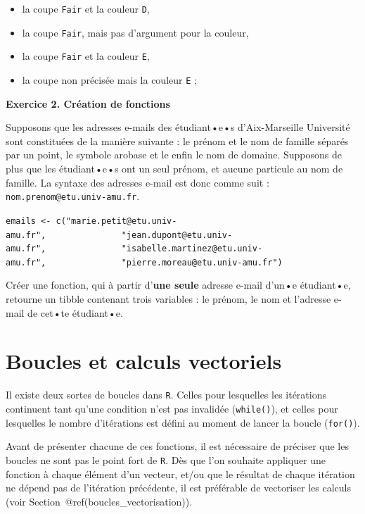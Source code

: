 \documentclass[
  11pt,
]{book}
\makeatletter
\providecommand{\tightlist}{%
  \setlength{\itemsep}{0pt}\setlength{\parskip}{0pt}}
\numberwithin{equation}{section}
\numberwithin{countremarque}{section}
\newenvironment{exframe}{%
 \def\at@end@of@exframe{}%
 \ifinner\ifhmode%
  \def\at@end@of@exframe{\end{minipage}}%
  \begin{minipage}{\columnwidth}%
 \fi\fi%
 \def\FrameCommand##1{\hskip\@totalleftmargin \hskip-\fboxsep
 \colorbox{shadecolorex}{##1}\hskip-\fboxsep
     \hskip-\linewidth \hskip-\@totalleftmargin \hskip\columnwidth}%
 \MakeFramed {\advance\hsize-\width
   \@totalleftmargin\z@ \linewidth\hsize
   \@setminipage}}%
 {\par\unskip\endMakeFramed%
 \at@end@of@exframe}
\makeatother
\begin{document}
\begin{exframe}
\begin{itemize}
\tightlist
\item
  la coupe \texttt{Fair} et la couleur \texttt{D},
\item
  la coupe \texttt{Fair}, mais pas d'argument pour la couleur,
\item
  la coupe \texttt{Fair} et la couleur \texttt{E},
\item
  la coupe non précisée mais la couleur \texttt{E} ;
\end{itemize}
\end{exframe}

\begin{exframe}
\textbf{Exercice 2. Création de fonctions}

Supposons que les adresses e-mails des étudiant•e•s d'Aix-Marseille Université sont constituées de la manière suivante : le prénom et le nom de famille séparés par un point, le symbole arobase et le enfin le nom de domaine. Supposons de plus que les étudiant•e•s ont un seul prénom, et aucune particule au nom de famille. La syntaxe des adresses e-mail est donc comme suit : \texttt{nom.prenom@etu.univ-amu.fr}.

\texttt{emails\ \textless{}-\ c("marie.petit@etu.univ-amu.fr",\ \ \ \ \ \ \ \ \ \ \ \ \ \ \ "jean.dupont@etu.univ-amu.fr",\ \ \ \ \ \ \ \ \ \ \ \ \ \ \ "isabelle.martinez@etu.univ-amu.fr",\ \ \ \ \ \ \ \ \ \ \ \ \ \ \ "pierre.moreau@etu.univ-amu.fr")}

Créer une fonction, qui à partir d'\textbf{une seule} adresse e-mail d'un•e étudiant•e, retourne un tibble contenant trois variables : le prénom, le nom et l'adresse e-mail de cet•te étudiant•e.
\end{exframe}

\hypertarget{boucles}{%
\chapter{Boucles et calculs vectoriels}\label{boucles}}

Il existe deux sortes de boucles dans \texttt{R}. Celles pour lesquelles les itérations continuent tant qu'une condition n'est pas invalidée (\texttt{while()}), et celles pour lesquelles le nombre d'itérations est défini au moment de lancer la boucle (\texttt{for()}).

Avant de présenter chacune de ces fonctions, il est nécessaire de préciser que les boucles ne sont pas le point fort de \texttt{R}. Dès que l'on souhaite appliquer une fonction à chaque élément d'un vecteur, et/ou que le résultat de chaque itération ne dépend pas de l'itération précédente, il est préférable de vectoriser les calculs (voir Section~@ref(boucles\_vectorisation)).
\end{document}
